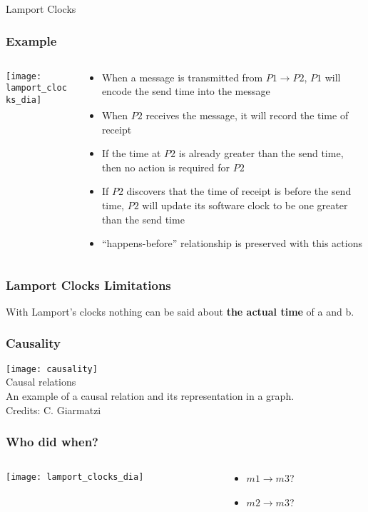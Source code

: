 \documentclass[aspectratio=169, 15pt,usenames,dvipsnames]{beamer}
\begin{document}
	\begin{gdblank}
		\centering\LARGE
		Lamport Clocks
	\end{gdblank}
	\begin{gdblank}
		\frametitle{Example}
		\begin{columns}
			\begin{column}{0.5\textwidth}
				\texttt{[image: lamport\_clocks\_dia]}			
			\end{column}
			\begin{column}{0.5\textwidth}
				\begin{itemize}
					\item When a message is transmitted from $P1 \rightarrow P2$, $P1$ will encode the send time into the message
					      \pause
					\item When $P2$ receives the message, it will record the time of receipt
					      \pause
					\item If the time at $P2$ is already greater than the send time, then no action is required for $P2$
					      \pause
					\item If $P2$ discovers that the time of receipt is before the send time, $P2$ will update its software clock to be one greater than the send time
					      \pause
					\item “happens-before” relationship is preserved with this actions
				\end{itemize}
			\end{column}	
		\end{columns}
	\end{gdblank}
	\begin{gdblank}
		\frametitle{Lamport Clocks Limitations}
		\centering
		\large		
		With Lamport’s clocks nothing can be said about \textbf{the actual time} of a and b.
	\end{gdblank}
	\begin{gdblank}
		\frametitle{Causality} 
		\texttt{[image: causality]}
		\centering\\Causal relations\\An example of a causal relation and its representation in a graph. 
		\tiny \\Credits: C. Giarmatzi
	\end{gdblank}   
	\begin{gdblank}
		\frametitle{Who did when?}
		\begin{columns}
			\begin{column}{0.5\textwidth}
				\texttt{[image: lamport\_clocks\_dia]}			
			\end{column}
			\begin{column}{0.5\textwidth}
				\LARGE
				\begin{itemize}
					\item $m1 \rightarrow m3$?
					\item $m2 \rightarrow m3$? 
				\end{itemize}
			\end{column}	
		\end{columns}
	\end{gdblank}
\end{document}
